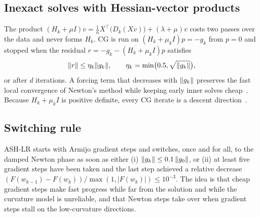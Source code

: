 \subsection{Inexact solves with Hessian-vector products}
The product $(H_k+\mu I)v=\frac1n X^\top\bigl(D_k(Xv)\bigr)+(\lambda+\mu)v$
costs two passes over the data and never forms $H_k$. CG is run on
$(H_k+\mu_kI)p=-g_k$ from $p=0$ and stopped when the residual
$r=-g_k-(H_k+\mu_kI)p$ satisfies
\begin{equation}\label{eq:forcing}
  \lVert r\rVert\le\eta_k\lVert g_k\rVert,\qquad \eta_k=\min\bigl(0.5,\sqrt{\lVert g_k\rVert}\bigr),
\end{equation}
or after $d$ iterations. A forcing term that decreases with $\lVert g_k\rVert$ preserves the
fast local convergence of Newton's method while keeping early inner solves
cheap~\cite{royer2020newton,yao2023inexact}. Because $H_k+\mu_kI$ is positive definite, every CG
iterate is a descent direction~\cite{wright2022optimization}.

\subsection{Switching rule}
ASH-LR starts with Armijo gradient steps and switches, once and for all, to the
damped Newton phase as soon as either
(i) $\lVert g_k\rVert\le 0.1\,\lVert g_0\rVert$, or
(ii) at least five gradient steps have been taken and the last step achieved a relative
decrease $(F(w_{k-1})-F(w_k))/\max(1,|F(w_k)|)\le10^{-3}$.
The idea is that cheap gradient steps make fast progress while far from the solution
and while the curvature model is unreliable, and that Newton steps take over when
gradient steps stall on the low-curvature directions.

